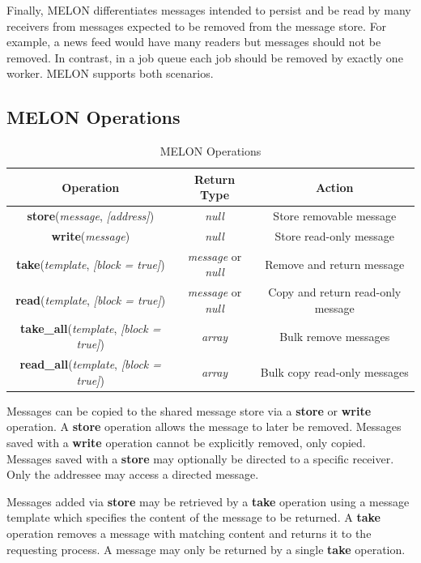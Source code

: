 \documentclass[lnicst]{svmultln}
\begin{document}
Finally, MELON differentiates messages intended to persist and be read by many receivers from messages expected to be removed from the message store. For example, a news feed would have many readers but messages should not be removed. In contrast, in a job queue each job should be removed by exactly one worker. MELON supports both scenarios.

\subsection{MELON Operations}

\begin{table}
\scriptsize
\caption{MELON Operations}
\centering
\begin{tabular}{|c|c|c|}
\hline
\textbf{Operation} & \textbf{Return Type} & \textbf{Action} \\ \hline
\textbf{store}(\textit{message}, \textit{[address]}) & \textit{null} & Store removable message \\ \hline
\textbf{write}(\textit{message}) & \textit{null} & Store read-only message \\ \hline
\textbf{take}(\textit{template}, \textit{[block = true]}) & \textit{message} or \textit{null} & Remove and return message \\ \hline
\textbf{read}(\textit{template}, \textit{[block = true]}) & \textit{message} or \textit{null} & Copy and return read-only message \\ \hline
\textbf{take\_all}(\textit{template}, \textit{[block = true]}) & \textit{array} & Bulk remove messages \\ \hline
\textbf{read\_all}(\textit{template}, \textit{[block = true]}) & \textit{array} & Bulk copy read-only messages \\ \hline
\end{tabular}
\end{table}

Messages can be copied to the shared message store via a \textbf{store} or \textbf{write} operation. A \textbf{store} operation allows the message to later be removed. Messages saved with a \textbf{write} operation cannot be explicitly removed, only copied. Messages saved with a \textbf{store} may optionally be directed to a specific receiver. Only the addressee may access a directed message.

Messages added via \textbf{store} may be retrieved by a \textbf{take} operation using a message template which specifies the content of the message to be returned. A \textbf{take} operation removes a message with matching content and returns it to the requesting process. A message may only be returned by a single \textbf{take} operation.
\end{document}
